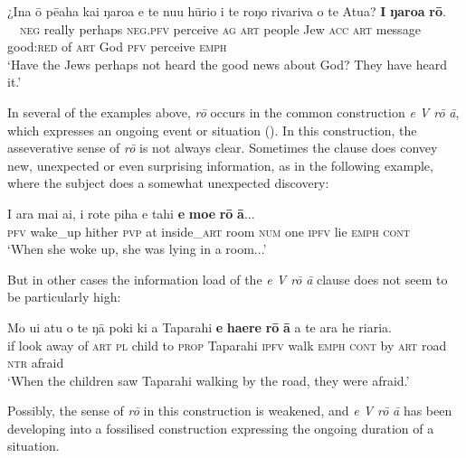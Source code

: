 \ea\label{ex:7.119}
\gll ¿{\ꞌ}Ina {\ꞌ}ō pēaha kai ŋaro{\ꞌ}a e te nu{\ꞌ}u hūrio i te roŋo rivariva o te {\ꞌ}Atua? \textbf{I} \textbf{ŋaro{\ꞌ}a} \textbf{rō}. \\
~~\textsc{neg} really perhaps \textsc{neg.pfv} perceive \textsc{ag} \textsc{art} people Jew \textsc{acc} \textsc{art} message good:\textsc{red} of \textsc{art} God \textsc{pfv} perceive \textsc{emph} \\

\glt 
‘Have the Jews perhaps not heard the good news about God? They have heard it.’ \textstyleExampleref{[Rom. 10:18]}
\z

In several of the examples above, \textit{rō} occurs in the common construction \textit{e V rō} \textit{{\ꞌ}ā}, which expresses an ongoing event or situation (). In this construction, the asseverative sense of \textit{rō} is not always clear. Sometimes the clause does convey new, unexpected or even surprising information, as in the following example, where the subject does a somewhat unexpected discovery:

\ea\label{ex:7.120}
\gll I {\ꞌ}ara mai ai, {\ꞌ}i rote piha e tahi \textbf{e} \textbf{moe} \textbf{rō} \textbf{{\ꞌ}ā}... \\
\textsc{pfv} wake\_up hither \textsc{pvp} at inside\_\textsc{art} room \textsc{num} one \textsc{ipfv} lie \textsc{emph} \textsc{cont} \\

\glt
‘When she woke up, she was lying in a room...’ \textstyleExampleref{[R210.090]} 
\z

But in other cases the information load of the \textit{e V rō} \textit{{\ꞌ}ā} clause does not seem to be particularly high:

\ea\label{ex:7.121}
\gll Mo u{\ꞌ}i atu o te ŋā poki ki a Taparahi \textbf{e} \textbf{ha{\ꞌ}ere} \textbf{rō} \textbf{{\ꞌ}ā} a te ara he ri{\ꞌ}ari{\ꞌ}a.\\
if look away of \textsc{art} \textsc{pl} child to \textsc{prop} Taparahi \textsc{ipfv} walk \textsc{emph} \textsc{cont} by \textsc{art} road \textsc{ntr} afraid\\

\glt
‘When the children saw Taparahi walking by the road, they were afraid.’ \textstyleExampleref{[R250.190]} 
\z

Possibly, the sense of \textit{rō} in this construction is weakened, and \textit{e V rō} \textit{{\ꞌ}ā} has been developing into a fossilised construction expressing the ongoing duration of a situation.
